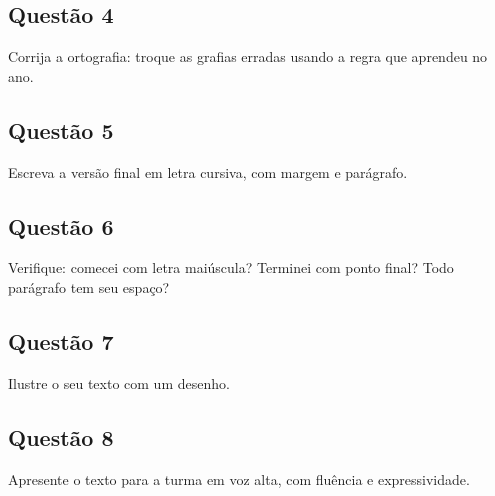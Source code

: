 \begin{center}
  \underline{\hspace{12cm}}
\end{center}

\subsection*{Questão 4}
Corrija a ortografia: troque as grafias erradas usando a regra que aprendeu no ano.

\begin{center}
  \underline{\hspace{12cm}}
\end{center}

\subsection*{Questão 5}
Escreva a versão final em letra cursiva, com margem e parágrafo.

\begin{center}
  \underline{\hspace{12cm}}
\end{center}

\subsection*{Questão 6}
Verifique: comecei com letra maiúscula? Terminei com ponto final? Todo parágrafo tem seu espaço?

\begin{center}
  \underline{\hspace{12cm}}
\end{center}

\subsection*{Questão 7}
Ilustre o seu texto com um desenho.

\begin{center}
  \underline{\hspace{12cm}}
\end{center}

\subsection*{Questão 8}
Apresente o texto para a turma em voz alta, com fluência e expressividade.

\begin{center}
  \underline{\hspace{12cm}}
\end{center}

